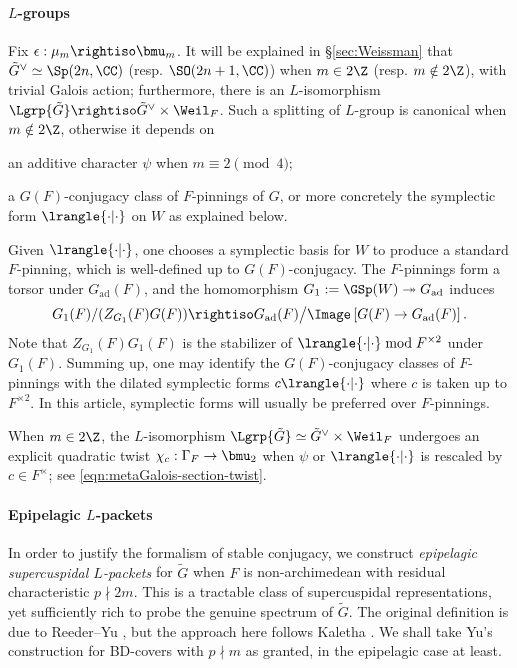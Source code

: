 \documentclass[a4paper,10pt]{article}
\begin{document}
\paragraph*{$L$-groups}
Fix $\epsilon: \mu_m \rightiso \bmu_m$. It will be explained in \S\ref{sec:Weissman} that $\tilde{G}^\vee \simeq \Sp(2n,\CC)$ (resp. $\SO(2n+1, \CC)$) when $m \in 2\Z$ (resp. $m \notin 2\Z$), with trivial Galois action; furthermore, there is an $L$-isomorphism $\Lgrp{\tilde{G}} \rightiso \tilde{G}^\vee \times \Weil_F$. Such a splitting of $L$-group is canonical when $m \notin 2\Z$, otherwise it depends on
\begin{compactitem}
	\item an additive character $\psi$ when $m \equiv 2 \pmod 4$;
	\item a $G(F)$-conjugacy class of $F$-pinnings of $G$, or more concretely the symplectic form $\lrangle{\cdot|\cdot}$ on $W$ as explained below.
\end{compactitem}
Given $\lrangle{\cdot|\cdot}$, one chooses a symplectic basis for $W$ to produce a standard $F$-pinning, which is well-defined up to $G(F)$-conjugacy. The $F$-pinnings form a torsor under $G_\text{ad}(F)$, and the homomorphism $G_1 := \GSp(W) \twoheadrightarrow G_\text{ad}$ induces
\[ G_1(F)/( Z_{G_1}(F) G(F)) \rightiso G_\text{ad}(F) \big/ \Image\left[ G(F) \to G_\text{ad}(F) \right]. \]
Note that $Z_{G_1}(F) G_1(F)$ is the stabilizer of $\lrangle{\cdot|\cdot} \bmod F^{\times 2}$ under $G_1(F)$. Summing up, one may identify the $G(F)$-conjugacy classes of $F$-pinnings with the dilated symplectic forms $c\lrangle{\cdot|\cdot}$ where $c$ is taken up to $F^{\times 2}$. In this article, symplectic forms will usually be preferred over $F$-pinnings.

When $m \in 2\Z$, the $L$-isomorphism $\Lgrp{\tilde{G}} \simeq \tilde{G}^\vee \times \Weil_F$ undergoes an explicit quadratic twist $\chi_c: \Gamma_F \to \bmu_2$ when $\psi$ or $\lrangle{\cdot|\cdot}$ is rescaled by $c \in F^\times$; see \eqref{eqn:metaGalois-section-twist}.

\paragraph*{Epipelagic $L$-packets}
In order to justify the formalism of stable conjugacy, we construct \emph{epipelagic supercuspidal $L$-packets} for $\tilde{G}$ when $F$ is non-archimedean with residual characteristic $p \nmid 2m$. This is a tractable class of supercuspidal representations, yet sufficiently rich to probe the genuine spectrum of $\tilde{G}$. The original definition is due to Reeder--Yu \cite{RY14}, but the approach here follows Kaletha \cite{Kal15,Kal16}. We shall take Yu's construction \cite{Yu01} for BD-covers with $p \nmid m$ as granted, in the epipelagic case at least.
\end{document}
